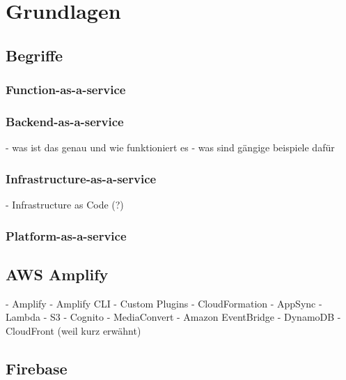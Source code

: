 \chapter{Grundlagen}

\section{Begriffe}
  \autocite{jiang2020overview}
  \autocite{kumar2019serverless}
  \autocite{dahunsi2021commercial}

  \subsection{Function-as-a-service}
  \subsection{Backend-as-a-service}
  - was ist das genau und wie funktioniert es
  - was sind gängige beispiele dafür
  \subsection{Infrastructure-as-a-service}
- Infrastructure as Code (?)

  \subsection{Platform-as-a-service}

\section{AWS Amplify}

\autocite{dahunsi2021commercial}
\autocite{amplifyDocs}
\autocite{lysakov2021security}
\autocite{mathew2014overview}
\autocite{beach2014aws}

  - Amplify
  - Amplify CLI
  - Custom Plugins
  - CloudFormation
  - AppSync
  - Lambda
  - S3
  - Cognito
  - MediaConvert
  - Amazon EventBridge
  - DynamoDB
  - CloudFront (weil kurz erwähnt)

\section{Firebase}

\autocite{moroney2017definitive}
\autocite{firebaseDocs}
\autocite{tanna2018serverless}